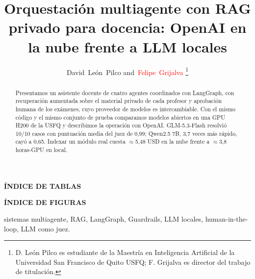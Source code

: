 \documentclass[journal]{IEEEtran}
\newenvironment{customfontsize}{
    \fontsize{12}{14}\selectfont
}{}
\begin{document}
\newpage

\begin{center}
    \textbf{\fontsize{14}{16}\selectfont ÍNDICE DE TABLAS}
\end{center}

\renewcommand{\listtablename}{}

\begin{customfontsize}
    \listoftables
\end{customfontsize}


\newpage
\begin{center}
    \textbf{\fontsize{14}{16}\selectfont ÍNDICE DE FIGURAS}
\end{center}

\renewcommand{\listfigurename}{}

\begin{customfontsize}
    \listoffigures
\end{customfontsize}

\newpage
\twocolumn


\title{Orquestación multiagente con RAG privado para docencia: OpenAI en la nube frente a LLM locales}

\author{David~León~Pilco
        and~\textcolor{red}{Felipe~Grijalva}%
\thanks{D. León Pilco es estudiante de la Maestría en Inteligencia Artificial de la Universidad San Francisco de Quito USFQ; F. Grijalva es director del trabajo de titulación.}%
}

\fontsize{10}{12}\selectfont
\maketitle

\begin{abstract}
Presentamos un asistente docente de cuatro agentes coordinados con LangGraph, con
recuperación aumentada sobre el material privado de cada profesor y aprobación humana de
los exámenes, cuyo proveedor de modelos es intercambiable. Con el mismo código y el mismo
conjunto de prueba comparamos modelos abiertos en una GPU H200 de la USFQ y describimos la
operación con OpenAI. GLM-5.3-Flash resolvió 10/10 casos con puntuación media del juez de
0,99; Qwen2.5 7B, 3,7 veces más rápido, cayó a 0,65. Indexar un módulo real cuesta
$\approx$5,48 USD en la nube frente a $\approx$3,8 horas-GPU en local.
\end{abstract}

\begin{IEEEkeywords}
sistemas multiagente, RAG, LangGraph, Guardrails, LLM locales, human-in-the-loop, LLM como juez.
\end{IEEEkeywords}
\end{document}
